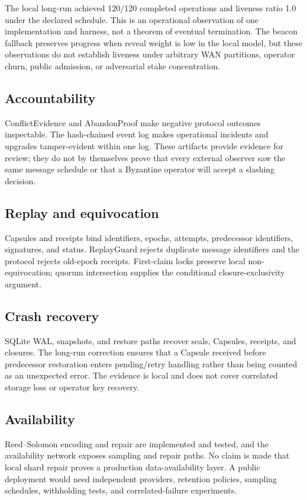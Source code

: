 \documentclass{ledger}
\begin{document}
The local long-run achieved 120/120 completed operations and liveness ratio 1.0 under the declared schedule. This is an operational observation of one implementation and harness, not a theorem of eventual termination. The beacon fallback preserves progress when reveal weight is low in the local model, but these observations do not establish liveness under arbitrary WAN partitions, operator churn, public admission, or adversarial stake concentration.

\subsection{Accountability}
ConflictEvidence and AbandonProof make negative protocol outcomes inspectable. The hash-chained event log makes operational incidents and upgrades tamper-evident within one log. These artifacts provide evidence for review; they do not by themselves prove that every external observer saw the same message schedule or that a Byzantine operator will accept a slashing decision.

\subsection{Replay and equivocation}
Capsules and receipts bind identifiers, epochs, attempts, predecessor identifiers, signatures, and status. ReplayGuard rejects duplicate message identifiers and the protocol rejects old-epoch receipts. First-claim locks preserve local non-equivocation; quorum intersection supplies the conditional closure-exclusivity argument.

\subsection{Crash recovery}
SQLite WAL, snapshots, and restore paths recover seals, Capsules, receipts, and closures. The long-run correction ensures that a Capsule received before predecessor restoration enters pending/retry handling rather than being counted as an unexpected error. The evidence is local and does not cover correlated storage loss or operator key recovery.

\subsection{Availability}
Reed--Solomon encoding and repair are implemented and tested, and the availability network exposes sampling and repair paths. No claim is made that local shard repair proves a production data-availability layer. A public deployment would need independent providers, retention policies, sampling schedules, withholding tests, and correlated-failure experiments.
\end{document}
